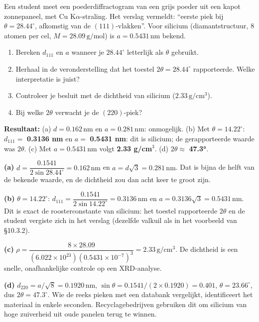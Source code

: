 \begin{oefening}
Een student meet een poederdiffractogram van een grijs poeder uit een kapot zonnepaneel, met Cu K\(\alpha\)-straling. Het verslag vermeldt: ``eerste piek bij \(\theta = 28.44^\circ\), afkomstig van de \((111)\)-vlakken''. Voor silicium (diamantstructuur, 8 atomen per cel, \(M = 28.09\,\mathrm{g/mol}\)) is \(a = 0.5431\,\mathrm{nm}\) bekend.

\begin{enumerate}
\item[(a)]
  Bereken \(d_{111}\) en \(a\) wanneer je \(28.44^\circ\) letterlijk als \(\theta\) gebruikt.
\item[(b)]
  Herhaal in de veronderstelling dat het toestel \(2\theta = 28.44^\circ\) rapporteerde. Welke interpretatie is juist?
\item[(c)]
  Controleer je besluit met de dichtheid van silicium (\(2.33\,\mathrm{g/cm^3}\)).
\item[(d)]
  Bij welke \(2\theta\) verwacht je de \((220)\)-piek?
\end{enumerate}
\end{oefening}
\begin{oplossing}
\textbf{Resultaat:} (a) \(d = 0.162\,\mathrm{nm}\) en \(a = 0.281\,\mathrm{nm}\): onmogelijk. (b) Met \(\theta = 14.22^\circ\): \(d_{111} =\) \textbf{0.3136 nm} en \(a =\) \textbf{0.5431 nm}: dit is silicium; de gerapporteerde waarde was \(2\theta\). (c) Met \(a = 0.5431\,\mathrm{nm}\) volgt \textbf{2.33 g/cm\ensuremath{^{3}}}. (d) \(2\theta \approx\) \textbf{47.3°}.

\textbf{(a)} \(d = \dfrac{0.1541}{2\sin 28.44^\circ} = 0.162\,\mathrm{nm}\) en \(a = d\sqrt{3} = 0.281\,\mathrm{nm}\). Dat is bijna de helft van de bekende waarde, en de dichtheid zou dan acht keer te groot zijn.

\textbf{(b)} \(\theta = 14.22^\circ\): \(d_{111} = \dfrac{0.1541}{2\sin 14.22^\circ} = 0.3136\,\mathrm{nm}\) en \(a = 0.3136\sqrt{3} = 0.5431\,\mathrm{nm}\). Dit is exact de roosterconstante van silicium: het toestel rapporteerde \(2\theta\) en de student vergiste zich in het verslag (dezelfde valkuil als in het voorbeeld van §10.3.2).

\textbf{(c)} \(\rho = \dfrac{8 \times 28.09}{(6.022\times10^{23})(0.5431\times10^{-7})^3} = 2.33\,\mathrm{g/cm^3}\). De dichtheid is een snelle, onafhankelijke controle op een XRD-analyse.

\textbf{(d)} \(d_{220} = a/\sqrt{8} = 0.1920\,\mathrm{nm}\), \(\sin\theta = 0.1541/(2 \times 0.1920) = 0.401\), \(\theta = 23.66^\circ\), dus \(2\theta = 47.3^\circ\). Wie de reeks pieken met een databank vergelijkt, identificeert het materiaal in enkele seconden. Recyclagebedrijven gebruiken dit om silicium van hoge zuiverheid uit oude panelen terug te winnen.
\end{oplossing}

